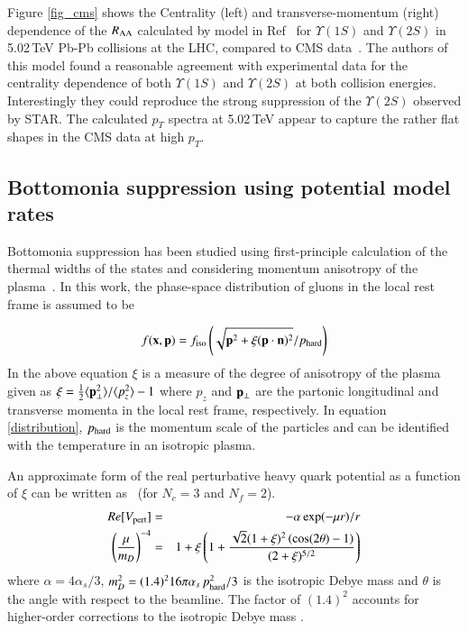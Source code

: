 {{Figure \ref{fig_cms} shows the Centrality (left) and transverse-momentum (right)
dependence of the $R_{\rm AA}$ calculated by model in Ref~\cite{Rapp:2017chc}
for $\Upsilon(1S)$ and $\Upsilon(2S)$ in 5.02\,TeV Pb-Pb collisions at the LHC,
compared to CMS data~\cite{Flores:2017qmcms}.
The authors of this model found a reasonable agreement  with experimental data
for the centrality dependence of both $\Upsilon(1S)$ and $\Upsilon(2S)$ at both
collision energies. Interestingly they could reproduce the strong suppression of
the $\Upsilon(2S)$ observed by STAR.  
The calculated $p_T$ spectra at 5.02\,TeV appear to capture the rather flat
shapes in the CMS data at high $p_T$. 



\subsection{Bottomonia suppression using potential model rates}

Bottomonia suppression has been studied using first-principle
calculation of the thermal widths of the states and considering 
momentum anisotropy of the plasma~\cite{Strickland:2011aa,Krouppa:2016jcl,Krouppa:2018lkt}.
In this work, the phase-space distribution of gluons in the local
rest frame is assumed to be 

\begin{equation} 
f({\bf x},{\bf p}) = f_{\rm iso}\left(\sqrt{{\bf p}^2+ \xi({\bf p}\cdot{\bf n})^2 }  / 
p_{\rm hard} \right) 
\label{distribution}
\end{equation} 
In the above equation $\xi$ is a measure of the degree of anisotropy of the plasma given as 
$\xi = \frac{1}{2} \langle 
{\bf p}_\perp^2\rangle/\langle p_z^2\rangle -1$
where $p_z$ and 
${\bf p}_\perp $ are the partonic longitudinal and transverse momenta in the local
rest frame, respectively. In equation \ref{distribution}, $p_{\rm hard}$ is the momentum  
scale of the particles and can be identified with the temperature
in an isotropic plasma. 

An approximate form of the real perturbative heavy quark potential as a function of
$\xi$ can be written as~\cite{Dumitru:2007hy} (for $N_c=3$ and $N_f=2$). 
\begin{eqnarray}
Re[V_{\rm pert}] &=& - \alpha \exp(-\mu r)/r \nonumber \\
\left(\frac{\mu}{m_D}\right)^{-4} &=&  
1 + \xi\left(1 + \frac{\sqrt{2}(1+\xi)^2\left(\cos(2\theta) - 1 \right)}{(2+ \xi)^{5/2}} \right) 
\label{eq:muparam}
\end{eqnarray}
where $\alpha = 4\alpha_s/3$, $m_D^2 = (1.4)^2 16 \pi \alpha_s  \, p_{\rm hard}^2/3$ is the isotropic
Debye mass and $\theta$ is the angle with respect to the beamline.  
The factor of $(1.4)^2$ accounts for higher-order corrections to the isotropic Debye 
mass \cite{Kaczmarek:2004gv}.

}}
